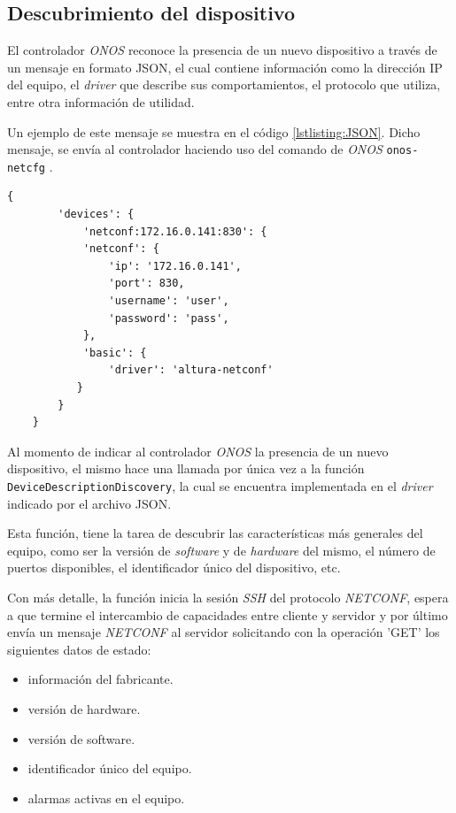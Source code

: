   \subsection{Descubrimiento del dispositivo} \label{driverr}
  El controlador \textit{ONOS} reconoce la presencia de un nuevo dispositivo a través de un mensaje en formato JSON, el cual contiene información como la dirección IP del equipo, el \textit{driver} que describe sus comportamientos, el protocolo que utiliza, entre otra información de utilidad. 
  
  Un ejemplo de este mensaje se muestra en el código \ref{lstlisting:JSON}. Dicho mensaje, se envía al controlador haciendo uso del comando de \textit{ONOS} \texttt{onos-netcfg} \parencite{onosconfserv}.

  \begin{lstlisting}[language=SHELXL, caption=Mensaje JSON con información del dispositivo., label=lstlisting:JSON]
    {
        'devices': {
            'netconf:172.16.0.141:830': {
            'netconf': {
                'ip': '172.16.0.141',
                'port': 830,
                'username': 'user',
                'password': 'pass',
            },
            'basic': {
                'driver': 'altura-netconf'
           }
        }
    }
    \end{lstlisting}


    Al momento de indicar al controlador \textit{ONOS} la presencia de un nuevo dispositivo, el mismo hace una llamada por única vez a la función \texttt{DeviceDescriptionDiscovery}, la cual se encuentra implementada en el \textit{driver} indicado por el archivo JSON. 

    Esta función, tiene la tarea de descubrir las características más generales del equipo, como ser la versión de \textit{software} y de \textit{hardware} del mismo, el número de puertos disponibles, el identificador único del dispositivo, etc.

    Con más detalle, la función inicia la sesión \textit{SSH} del protocolo \textit{NETCONF}, espera a que termine el intercambio de capacidades entre cliente y servidor y por último envía un mensaje \textit{NETCONF} al servidor solicitando con la operación 'GET' los siguientes datos de estado:  
    
    \begin{itemize}
        \item información del fabricante.
        \item versión de hardware.
        \item versión de software.
        \item identificador único del equipo.
        \item alarmas activas en el equipo.
    \end{itemize}


